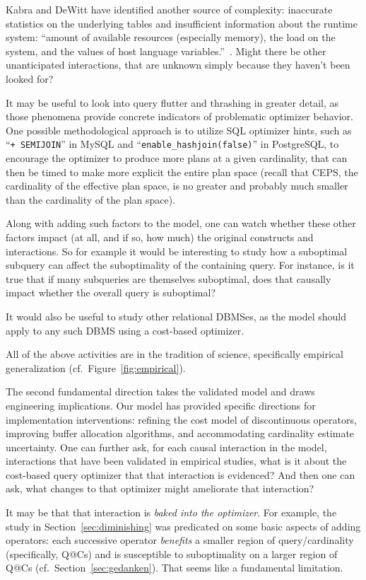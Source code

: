 \documentclass[prodmode,acmtods]{acmsmall}
\begin{document}
Kabra and
\hbox{DeWitt} have identified another source of complexity: inaccurate
statistics on the underlying tables and insufficient information about the
runtime system: ``amount of available resources (especially memory), the
load on the system, and the values of host language
variables.''~\cite[p.~106]{kabra98}.  Might there be other unanticipated
interactions, that are unknown simply because they haven't been
looked for?

It may be useful to look into query flutter and thrashing in greater detail, as those phenomena
provide concrete indicators of problematic optimizer behavior. One
possible methodological approach is to utilize SQL optimizer hints, such as
``{\tt \*+ SEMIJOIN}'' in MySQL and ``{\tt enable\_hashjoin(false)}'' in PostgreSQL,
to encourage the optimizer to produce more plans at a given cardinality,
that can then be timed to make more explicit the entire plan space (recall that
CEPS, the cardinality of the effective plan space, is no greater and
probably much smaller than the cardinality of the plan space).

Along with adding such factors to the model, one can watch whether these
other factors impact (at all, and if so, how much) the original constructs
and interactions. So for example it would be interesting to study how a suboptimal subquery can affect
the suboptimality of the containing query.  For instance, is it true that if
many subqueries are themselves suboptimal, does that causally impact whether
the overall query is suboptimal? 

It would also be useful to study other relational DBMSes, as the model
should apply to any such DBMS using a cost-based optimizer.

All of the above activities are in the tradition of science, specifically
empirical generalization (cf.~Figure~\ref{fig:empirical}).

The second fundamental direction takes the validated model and draws
engineering implications. Our model has provided specific directions for implementation interventions:
refining the cost model of discontinuous operators, improving buffer
allocation algorithms, and accommodating cardinality estimate uncertainty.
One can further ask, for each causal interaction in the model,
interactions that have been validated in empirical studies, what is it about
the cost-based query optimizer that that interaction is evidenced? And then
one can ask, what changes to that optimizer might ameliorate that
interaction?

It may be that that interaction is {\em baked into the optimizer}. For
example, the study in Section~\ref{sec:diminishing} was predicated on some
basic aspects of adding operators: each successive operator {\em benefits} a smaller region
of query/cardinality (specifically, Q@Cs) and is susceptible to
suboptimality on a larger region of Q@Cs
(cf.~Section~\ref{sec:gedanken}). That seems like a fundamental limitation.
\end{document}
